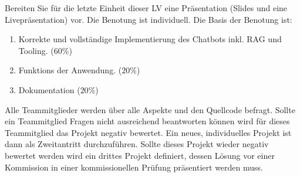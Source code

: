 \documentclass{article}
\begin{document}
Bereiten Sie für die letzte Einheit dieser LV eine Präsentation (Slides und eine Livepräsentation) vor. 
Die Benotung ist individuell. 
Die Basis der Benotung ist:
\begin{enumerate}
    \item Korrekte und vollständige Implementierung des Chatbots inkl. RAG und Tooling. ($60\%$)
    \item Funktions der Anwendung. ($20\%$)
    \item Dokumentation ($20\%$)
\end{enumerate}
Alle Teammitglieder werden über alle Aspekte und den Quellcode befragt. 
Sollte ein Teammitglied Fragen nicht ausreichend beantworten können wird für dieses Teammitglied das Projekt negativ bewertet. 
Ein neues, individuelles Projekt ist dann als Zweitantritt durchzuführen.
Sollte dieses Projekt wieder negativ bewertet werden wird ein drittes Projekt definiert, dessen Lösung vor einer Kommission in einer kommissionellen Prüfung präsentiert werden muss.
\end{document}
